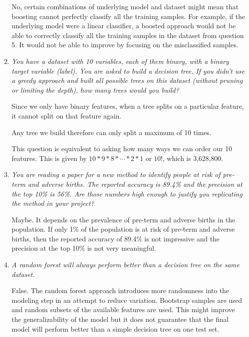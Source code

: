 \documentclass{article}
\begin{document}
\begin{enumerate}
        No, certain combinations of underlying model and dataset might mean
        that boosting cannot perfectly classify all the training samples. For
        example, if the underlying model were a linear classifier, a boosted
        approach would not be able to correctly classify all the training
        samples in the dataset from question 5. It would not be able to
        improve by focusing on the misclassified samples.

    \item \textit{You have a dataset with 10 variables, each of them binary,
        with a binary target variable (label). You are asked to build a
        decision tree. If you didn't use a greedy approach and built all
        possible trees on this dataset (without pruning or limiting the
        depth), how many trees would you build?}

        Since we only have binary features, when a tree splits on a particular
        feature, it cannot split on that feature again.

        Any tree we build therefore can only split a maximum of 10 times.

        This question is equivalent to asking how many ways we can order our 10
        features. This is given by $10 * 9 * 8 * \cdots * 2 * 1$ or $10!$,
        which is 3,628,800.

    \item \textit{You are reading a paper for a new method to identify people
        at risk of pre-term and adverse births. The reported accuracy is 89.4\%
        and the precision at the top 10\% is 56\%. Are those numbers high
        enough to justify you replicating the method in your project?}

        Maybe. It depends on the prevalence of pre-term and adverse births in
        the population. If only 1\% of the population is at risk of pre-term
        and adverse births, then the reported accuracy of 89.4\% is not
        impressive and the precision at the top 10\% is not very meaningful.

    \item \textit{A random forest will always perform better than a decision
        tree on the same dataset.}

        False. The random forest approach introduces more randomness into the
        modeling step in an attempt to reduce variation. Bootstrap samples are
        used and random subsets of the available features are used. This might
        improve the generalizability of the model but it does not guarantee
        that the final model will perform better than a simple decision tree on
        one test set.


\end{enumerate}
\end{document}
